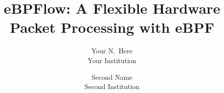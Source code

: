 \usepackage{comment}

\usepackage{todonotes}
\newcommand{\marcos}[1]{\todo[author=Marcos,inline]{#1}}



\date{}

\title{\Large \bf eBPFlow: A Flexible Hardware Packet Processing with eBPF}

\author{
{\rm Your N.\ Here}\\
Your Institution
\and
{\rm Second Name}\\
Second Institution
} %

\maketitle

















